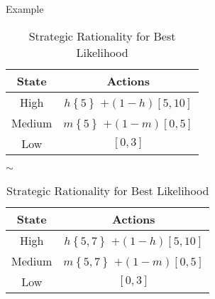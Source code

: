 \documentclass[usenames,dvipsnames,aspectratio=169,11pt, envcountsect, handout]{beamer}
\begin{document}
\begin{frame}[noframenumbering]{Example}
	\begin{table}[H]
		\centering
		\begin{minipage}{0.45\textwidth}
			\centering
			\begin{tabular}{c | c}
				State                          & Actions                                                                                       \\
				\hline
				{\color{bleudefrance} High}    & {\color{bleudefrance}\( h \left\{ 5 \right\} \) } \(+ \left(1-h \right) \left[5,10 \right] \) \\
				{\color{bleudefrance} Medium } & {\color{bleudefrance}\( m \left\{ 5 \right\} \) } \(+ \left(1-m \right) \left[0,5 \right] \)  \\
				Low                            & \( \left[0,3 \right] \)                                                                       \\
			\end{tabular}
			\vspace{0.5cm} %
		\end{minipage}\hspace{0.25cm} %
		\( \sim \) %
		\hspace{0.25cm}
		\begin{minipage}{0.45\textwidth}
			\centering
			\begin{tabular}{c | c}
				State                          & Actions                                                                                         \\
				\hline
				{\color{bleudefrance} High}    & {\color{bleudefrance}\( h \left\{ 5,7 \right\} \) } \(+ \left(1-h \right) \left[5,10 \right] \) \\
				{\color{bleudefrance} Medium } & {\color{bleudefrance}\( m \left\{ 5,7 \right\} \) } \(+ \left(1-m \right) \left[0,5 \right] \)  \\
				Low                            & \( \left[0,3 \right] \)                                                                         \\
			\end{tabular}
			\vspace{0.5cm} %
		\end{minipage}
		\caption{Strategic Rationality for Best Likelihood} %
		\label{tab:srbl}
	\end{table}
\end{frame}
\end{document}
